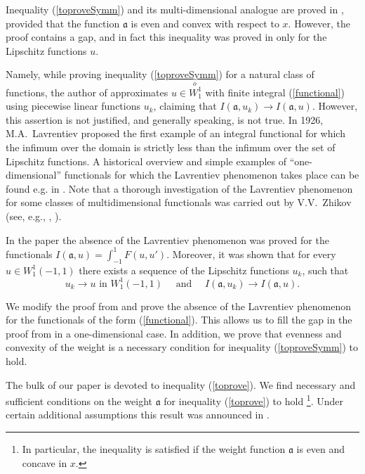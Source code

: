 \documentclass[12pt]{article}
\newcommand{\Wf}{\stackrel{o\ }{W_1^1}}
\newcommand{\W}{W_1^1}
\begin{document}
Inequality (\ref{toproveSymm}) and its multi-dimensional analogue
are proved in \cite{Br}, provided that the function $\mathfrak a$ is even and convex
with respect to $x$. However, the proof contains a gap,
and in fact this inequality was proved in \cite{Br} only for the Lipschitz functions $u$.

Namely, while proving inequality (\ref{toproveSymm}) for a natural class of functions,
the author of \cite{Br} approximates $u \in \Wf$ with finite integral (\ref{functional})
using piecewise linear functions $u_k$, claiming that $I(\mathfrak a, u_k) \to I(\mathfrak a, u)$.
However, this assertion is not justified, and generally speaking, is not true.
In 1926, M.A.~Lavrentiev proposed the first example of an integral functional
for which the infimum over the domain is strictly less than the infimum over the set of 
Lipschitz functions.
A historical overview and simple examples of ``one-dimensional''
functionals for which the Lavrentiev phenomenon takes place can be found e.g. in \cite{BGH}.
Note that a thorough investigation of the Lavrentiev phenomenon for some classes of multidimensional
functionals was carried out by V.V.~Zhikov (see, e.g., \cite{Zh1}, \cite{Zh2}).

In the paper \cite{ASC} the absence of the Lavrentiev phenomenon was proved for the functionals
$I(\mathfrak a, u) = \int_{-1}^1 F(u, u')$. Moreover, it was shown that for every $u \in \W(-1, 1)$
there exists a sequence of the Lipschitz functions $u_k$, such that
\begin{equation}
\label{convergence}
u_k \to u \text{ in } \W (-1, 1) \quad \text{ and } \quad I (\mathfrak a, u_k) \to I (\mathfrak a, u).
\end{equation}

We modify the proof from \cite{ASC} and prove the absence of the Lavrentiev phenomenon
for the functionals of the form (\ref{functional}).
This allows us to fill the gap in the proof from \cite{Br} in a one-dimensional case.
In addition, we prove that evenness and convexity of the weight is a necessary condition
for inequality (\ref{toproveSymm}) to hold.

The bulk of our paper is devoted to inequality (\ref{toprove}).
We find necessary and sufficient conditions on the weight $\mathfrak a$ for inequality
(\ref{toprove}) to hold%
\footnote{In particular, the inequality is satisfied if the weight function $\mathfrak a$ is even 
and concave in $x$.}.
Under certain additional assumptions this result was announced in \cite{DAN}.
\end{document}
